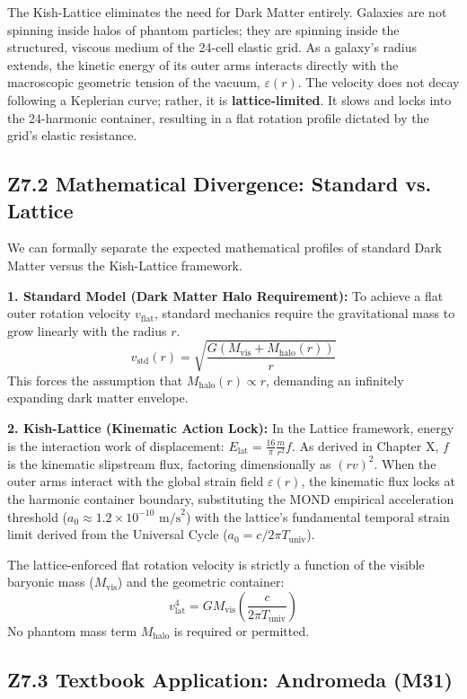 \documentclass[11pt, letterpaper, openany]{book}
\begin{document}
The Kish-Lattice eliminates the need for Dark Matter entirely. Galaxies are not spinning inside halos of phantom particles; they are spinning inside the structured, viscous medium of the 24-cell elastic grid. As a galaxy's radius extends, the kinetic energy of its outer arms interacts directly with the macroscopic geometric tension of the vacuum, $\varepsilon(r)$. The velocity does not decay following a Keplerian curve; rather, it is \textbf{lattice-limited}. It slows and locks into the 24-harmonic container, resulting in a flat rotation profile dictated by the grid's elastic resistance.

\subsection*{Z7.2 Mathematical Divergence: Standard vs. Lattice}

We can formally separate the expected mathematical profiles of standard Dark Matter versus the Kish-Lattice framework. 

\textbf{1. Standard Model (Dark Matter Halo Requirement):}
To achieve a flat outer rotation velocity $v_{\text{flat}}$, standard mechanics require the gravitational mass to grow linearly with the radius $r$.
\[
v_{\text{std}}(r) = \sqrt{\frac{G (M_{\text{vis}} + M_{\text{halo}}(r))}{r}}
\]
This forces the assumption that $M_{\text{halo}}(r) \propto r$, demanding an infinitely expanding dark matter envelope.

\textbf{2. Kish-Lattice (Kinematic Action Lock):}
In the Lattice framework, energy is the interaction work of displacement: $E_{\text{lat}} = \frac{16}{\pi} \frac{m}{r^2} f$. As derived in Chapter X, $f$ is the kinematic slipstream flux, factoring dimensionally as $(rv)^2$. When the outer arms interact with the global strain field $\varepsilon(r)$, the kinematic flux locks at the harmonic container boundary, substituting the MOND empirical acceleration threshold ($a_0 \approx 1.2 \times 10^{-10} \text{ m/s}^2$) with the lattice's fundamental temporal strain limit derived from the Universal Cycle ($a_0 = c / 2\pi T_{\text{univ}}$).

The lattice-enforced flat rotation velocity is strictly a function of the visible baryonic mass ($M_{\text{vis}}$) and the geometric container:
\[
v_{\text{lat}}^4 = G M_{\text{vis}} \left( \frac{c}{2\pi T_{\text{univ}}} \right)
\]
No phantom mass term $M_{\text{halo}}$ is required or permitted. 

\subsection*{Z7.3 Textbook Application: Andromeda (M31)}
\end{document}
